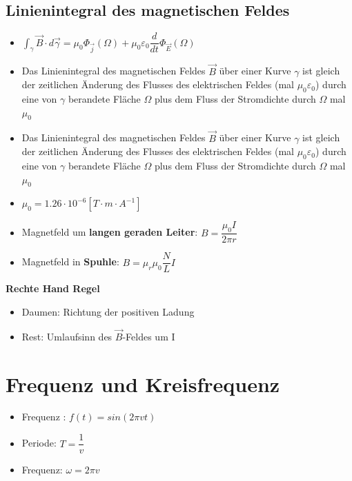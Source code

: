 \documentclass[8pt,a4paper]{scrartcl}
\begin{document}
\begin{multicols*}{3}
				\subsection{Linienintegral des magnetischen Feldes}
					\begin{itemize}\itemsep0pt
						\item $\int_{\gamma} \overrightarrow{B} \cdot d \overrightarrow{\gamma} = \mu_{0}\Phi_{\overrightarrow{j}}(\Omega) + \mu_{0}\varepsilon_{0} \dfrac{d}{dt} \Phi_{\overrightarrow{E}}(\Omega)$
						\item Das Linienintegral des magnetischen Feldes $\overrightarrow{B}$ über einer Kurve $\gamma$ ist gleich der zeitlichen Änderung des Flusses des elektrischen Feldes (mal $\mu_{0}\varepsilon_{0}$) durch eine von $\gamma$ berandete Fläche $\Omega$ plus dem Fluss der Stromdichte durch $\Omega$ mal $\mu_{0}$
						\item Das Linienintegral des magnetischen Feldes $\overrightarrow{B}$ über einer Kurve $\gamma$ ist gleich der zeitlichen Änderung des Flusses des elektrischen Feldes (mal $\mu_{0}\varepsilon_{0}$) durch eine von $\gamma$ berandete Fläche $\Omega$ plus dem Fluss der Stromdichte durch $\Omega$ mal $\mu_{0}$
						\item $\mu_{0}= 1.26\cdot 10^{-6}[T\cdot m\cdot A^{-1}]$
						\item Magnetfeld um \textbf{langen geraden Leiter}: $B= \dfrac{\mu_{0}I}{2\pi r}$
						\item Magnetfeld in \textbf{Spuhle}: $B= \mu_{r} \mu_{0} \dfrac{N}{L}I$
					\end{itemize}	
					\textbf{Rechte Hand Regel}
					\begin{itemize}\itemsep0pt
						\item Daumen: Richtung der positiven Ladung
						\item Rest: Umlaufsinn des $\overrightarrow{B}$-Feldes um I
					\end{itemize}		
					
			\section{Frequenz und Kreisfrequenz}
				\begin{itemize}\itemsep0pt
					\item Frequenz : $f(t) = sin(2\pi vt)$
					\item Periode: $T = \dfrac{1}{v}$
					\item Frequenz: $\omega = 2\pi v$
				\end{itemize}	
				

\end{multicols*}
\end{document}

